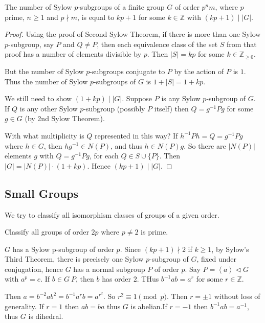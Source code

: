
\begin{theorem}
	The number of Sylow $p$-subgroups of a finite group $G$ of order $p^n m$, where $p$ prime, $n\ge 1$ and $p\nmid m$, is equal to $kp+1$ for some $k \in \mathbb{Z}$ with $(kp+1) \mid |G|$.
\end{theorem}
\begin{proof}
	Using the proof of Second Sylow Theorem, if there is more than one Sylow $p$-subgroup, say $P$ and $Q \neq P$, then each equivalence class of the set $S$ from that proof has a number of elements divisible by $p$. Then $|S| = k p$ for some $k \in \mathbb{Z}_{\ge 0}$.

	But the number of Sylow $p$-subgroups conjugate to $P$ by the action of $P$ is $1$.
	Thus the number of Sylow $p$-subgroups of $G$ is $1 + |S| = 1 + k p$.

	We still need to show $(1+kp) \mid |G|$. Suppose $P$ is any Sylow  $p$-subgroup of $G$. If $Q$ is any other Sylow $p$-subgroup (possibly $P$ itself) then $Q = g^{-1} Pg$ for some $g \in G$ (by 2nd Sylow Theorem). 

	With what multiplicity is $Q$ represented in this way? If $h^{-1} Ph = Q =  g^{-1} Pg$ where $h \in G$, then $hg^{-1} \in N(P)$, and thus $h \in N(P)g$. So there are $|N(P)|$ elements $g$ with $Q = g^{-1} Pg$, for each $Q \in S \cup \{P\} $. Then $|G| = |N(P)| \cdot (1+kp)$. Hence $(kp+1) \mid |G|$.
\end{proof}

\subsection{Small Groups}
We try to classify all isomorphism classes of groups of a given order.

\begin{example}
	Classify all groups of order $2p$ where $p\neq 2$ is prime.

	$G$ has a Sylow p-subgroup of order $p$. Since $(kp+1)\nmid 2$ if $k\ge 1$, by Sylow's Third Theorem, there is  precisely one Sylow $p$-subgroup of $G$, fixed under conjugation, hence $G$ has a normal subgroup $P$ of order $p$. Say $P = \left\langle a \right\rangle \triangleleft G$ with $a^p = e$. If $b \in G \ P$, then $b$ has order $2$. THus $b^{-1} ab = a^r$ for some $r \in \mathbb{Z}$.

	Then $a = b^{-2} a b^2 = b^{-1} a^r b = a^{r^2}$. So $r^2 \equiv 1 \pmod p$. Then $r = \pm 1$ without loss of generality. If $r = 1$ then $ab=ba$ thus $G$ is abelian.If $r = -1$ then $b^{-1} ab = a^{-1} $, thus $G$ is dihedral.
\end{example}


